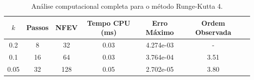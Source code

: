 \begin{table}[H]
    \centering
    \begin{tabular}{ccccccc}
        \hline
        $k$ & Passos & NFEV & Tempo CPU (ms) & Erro Máximo & Ordem Observada \\
        \hline
        0.2 & 8 & 32 & 0.03  & 4.274e-03 & - \\
        0.1 & 16 & 64 & 0.03  & 3.764e-04 & 3.51 \\
        0.05 & 32 & 128 & 0.05  & 2.702e-05 & 3.80 \\
        \hline
    \end{tabular}
    \caption{Análise computacional completa para o método Runge-Kutta 4.}
    \label{tab:erros_runge-kutta_4}
\end{table}
